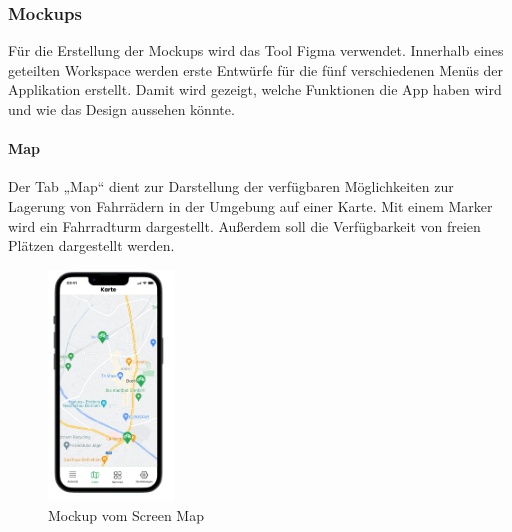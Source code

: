 \subsubsection{Mockups}
Für die Erstellung der \Gls{Mockup}s wird das Tool Figma verwendet. Innerhalb eines geteilten Workspace werden erste Entwürfe für die fünf verschiedenen Menüs der Applikation erstellt. Damit wird gezeigt, welche Funktionen die App haben wird und wie das Design aussehen könnte.\\

\paragraph{Map}Der \Gls{Tab} „Map“ dient zur Darstellung der verfügbaren Möglichkeiten zur Lagerung von Fahrrädern in der Umgebung auf einer Karte. Mit einem Marker wird ein Fahrradturm dargestellt. Außerdem soll die Verfügbarkeit von freien Plätzen dargestellt werden.\\
\begin{figure}[H]
  \centering
  \includegraphics[width=0.3\textwidth]{images/app_mock_map}
  \caption{\Gls{Mockup} vom Screen Map}
  \label{fig:screenmapmock}
\end{figure}

